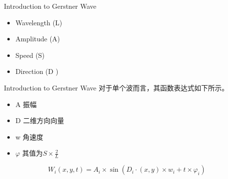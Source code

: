 \documentclass[handout,t]{beamer}
\begin{document}
\begin{frame}{Introduction to Gerstner Wave}
  \begin{itemize}
    \item Wavelength (L)\\ 
    \item Amplitude (A)\\
    \item Speed (S)\\
    \item Direction (D )\\
  \end{itemize}
  \begin{figure}[thpb]
    \centering
  \label{fig:gerstner_intro}
  \end{figure}
\end{frame}

\begin{frame}{Introduction to Gerstner Wave}
  对于单个波而言，其函数表达式如下所示。\\ 
  \begin{itemize}
    \item A 振幅 \\
    \item D 二维方向向量 \\
    \item w 角速度 \\
    \item $\varphi$ 其值为$S \times \frac{2}{L}$
  \end{itemize}
  $$W_i(x,y,t) = A_i \times \sin(D_i \cdot (x,y) \times w_i + t \times \varphi_i)$$
\end{frame}
\end{document}
